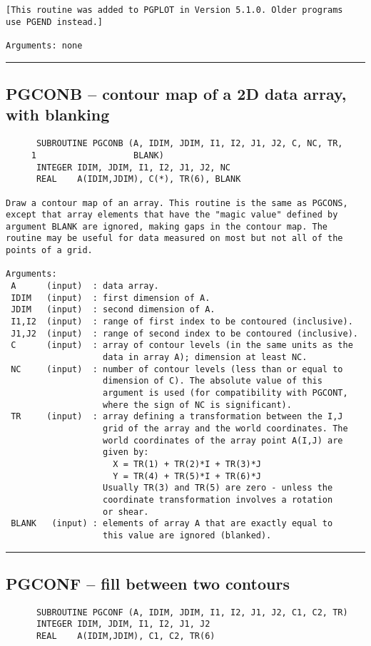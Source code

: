 {\begin{verbatim}
[This routine was added to PGPLOT in Version 5.1.0. Older programs
use PGEND instead.]

Arguments: none
\end{verbatim}
\hrule


\subsection*{PGCONB -- contour map of a 2D data array, with blanking }
\begin{verbatim}
      SUBROUTINE PGCONB (A, IDIM, JDIM, I1, I2, J1, J2, C, NC, TR, 
     1                   BLANK)
      INTEGER IDIM, JDIM, I1, I2, J1, J2, NC
      REAL    A(IDIM,JDIM), C(*), TR(6), BLANK

Draw a contour map of an array. This routine is the same as PGCONS,
except that array elements that have the "magic value" defined by
argument BLANK are ignored, making gaps in the contour map. The
routine may be useful for data measured on most but not all of the
points of a grid.

Arguments:
 A      (input)  : data array.
 IDIM   (input)  : first dimension of A.
 JDIM   (input)  : second dimension of A.
 I1,I2  (input)  : range of first index to be contoured (inclusive).
 J1,J2  (input)  : range of second index to be contoured (inclusive).
 C      (input)  : array of contour levels (in the same units as the
                   data in array A); dimension at least NC.
 NC     (input)  : number of contour levels (less than or equal to
                   dimension of C). The absolute value of this
                   argument is used (for compatibility with PGCONT,
                   where the sign of NC is significant).
 TR     (input)  : array defining a transformation between the I,J
                   grid of the array and the world coordinates. The
                   world coordinates of the array point A(I,J) are
                   given by:
                     X = TR(1) + TR(2)*I + TR(3)*J
                     Y = TR(4) + TR(5)*I + TR(6)*J
                   Usually TR(3) and TR(5) are zero - unless the
                   coordinate transformation involves a rotation
                   or shear.
 BLANK   (input) : elements of array A that are exactly equal to
                   this value are ignored (blanked).
\end{verbatim}
\hrule


\subsection*{PGCONF -- fill between two contours }
\begin{verbatim}
      SUBROUTINE PGCONF (A, IDIM, JDIM, I1, I2, J1, J2, C1, C2, TR)
      INTEGER IDIM, JDIM, I1, I2, J1, J2
      REAL    A(IDIM,JDIM), C1, C2, TR(6)


\end{verbatim}}
